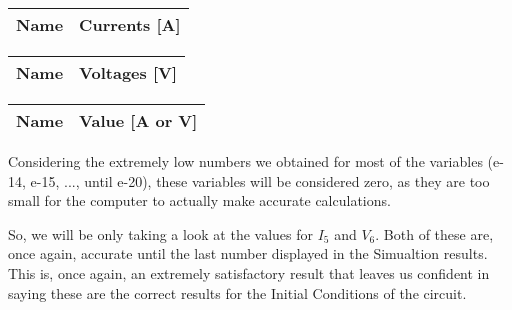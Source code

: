   \begin{tabular}{|l|r|}
    \hline    
    {\bf Name} & {\bf Currents [A]} \\ \hline
    
  \end{tabular}
\quad
  \begin{tabular}{|l|r|}
    \hline    
    {\bf Name} & {\bf Voltages [V]} \\ \hline
    
  \end{tabular}
\quad
\begin{tabular}{|l|r|}
    \hline    
    {\bf Name} & {\bf Value [A or V]} \\ \hline
    
  \end{tabular}

Considering the extremely low numbers we obtained for most of the variables (e-14, e-15, ..., until e-20), these variables will be considered zero, as they are too small for the computer to actually make accurate calculations.

So, we will be only taking a look at the values for $I_5$ and $V_6$. Both of these are, once again, accurate until the last number displayed in the Simualtion results. This is, once again, an extremely satisfactory result that leaves us confident in saying these are the correct results for the Initial Conditions of the circuit.
